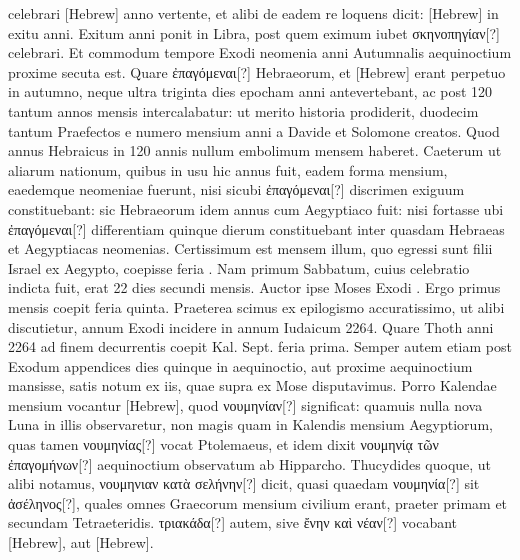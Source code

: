 celebrari \texthebrew{}[Hebrew] anno vertente, et alibi de eadem re loquens
dicit: \texthebrew{}[Hebrew] in exitu anni.
Exitum anni ponit in Libra,
post quem eximum iubet \textgreek{σκηνοπηγίαν}[?] celebrari.
Et commodum tempore
Exodi neomenia anni Autumnalis aequinoctium proxime secuta
est.
Quare \textgreek{ἐπαγόμεναι}[?] Hebraeorum,
 et \texthebrew{}[Hebrew] erant perpetuo
in autumno, neque ultra triginta dies epocham anni antevertebant,
ac post 120 tantum annos mensis intercalabatur: ut merito historia
prodiderit, duodecim tantum Praefectos e numero mensium anni a
Davide et Solomone creatos.
Quod annus Hebraicus in 120 annis
nullum embolimum mensem haberet.
Caeterum ut aliarum nationum,
quibus in usu hic annus fuit, eadem forma mensium, eaedemque
neomeniae fuerunt, nisi sicubi \textgreek{ἐπαγόμεναι}[?] discrimen exiguum
constituebant: sic Hebraeorum idem annus cum Aegyptiaco fuit: nisi
fortasse ubi \textgreek{ἐπαγόμεναι}[?] differentiam quinque dierum
 constituebant inter
quasdam Hebraeas et Aegyptiacas neomenias.
Certissimum est mensem
illum, quo egressi sunt filii Israel ex Aegypto, coepisse feria .
Nam primum
Sabbatum, %
 cuius celebratio indicta fuit, erat 22 dies secundi mensis.
Auctor ipse Moses Exodi .
Ergo primus mensis coepit feria quinta.
Praeterea scimus ex epilogismo accuratissimo,
 ut alibi discutietur, annum
Exodi incidere in annum Iudaicum 2264.
Quare Thoth anni
2264 ad finem decurrentis coepit Kal. Sept. feria prima. %
Semper autem
etiam post Exodum appendices dies quinque %
 in aequinoctio, aut proxime
aequinoctium mansisse, satis notum ex iis, quae supra ex Mose disputavimus.
Porro Kalendae mensium vocantur \texthebrew{}[Hebrew],
 quod \textgreek{νουμηνίαν}[?] significat:
quamuis nulla nova Luna in illis observaretur, non magis
quam in Kalendis mensium Aegyptiorum, quas tamen
 \textgreek{νουμηνίας}[?] vocat
Ptolemaeus, et idem dixit \textgreek{νουμηνίᾳ τῶν ἐπαγομήνων}[?]
 aequinoctium observatum
ab Hipparcho.
%
Thucydides quoque, ut alibi notamus,
\textgreek{νουμηνιαν κατὰ σελήνην}[?] dicit, quasi quaedam
 \textgreek{νουμηνία}[?] sit \textgreek{ἀσέληνος}[?], quales
omnes Graecorum mensium civilium erant, praeter primam et
secundam Tetraeteridis.
\textgreek{τριακάδα}[?] autem,
 sive \textgreek{ἔνην καὶ νέαν}[?] vocabant
\texthebrew{}[Hebrew], aut \texthebrew{}[Hebrew].
